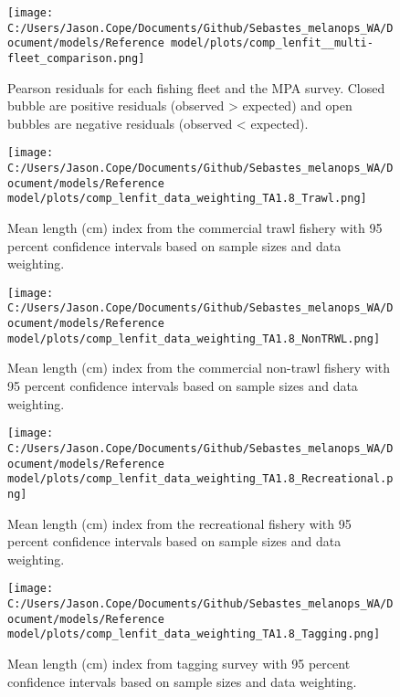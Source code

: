 \documentclass[11pt,
  english,
  letterpaper,
]{article}
\begin{document}
\begin{figure}
\centering
\texttt{[image: C:/Users/Jason.Cope/Documents/Github/Sebastes\_melanops\_WA/Document/models/Reference model/plots/comp\_lenfit\_\_multi-fleet\_comparison.png]}
\caption{Pearson residuals for each fishing fleet and the MPA survey. Closed bubble are positive residuals (observed \textgreater{} expected) and open bubbles are negative residuals (observed \textless{} expected).\label{fig:lt-pearson-resids}}
\end{figure}

\pagebreak

\begin{figure}
\centering
\texttt{[image: C:/Users/Jason.Cope/Documents/Github/Sebastes\_melanops\_WA/Document/models/Reference model/plots/comp\_lenfit\_data\_weighting\_TA1.8\_Trawl.png]}
\caption{Mean length (cm) index from the commercial trawl fishery with 95 percent confidence intervals based on sample sizes and data weighting.\label{fig:trawl-mean-len-fit}}
\end{figure}

\pagebreak

\begin{figure}
\centering
\texttt{[image: C:/Users/Jason.Cope/Documents/Github/Sebastes\_melanops\_WA/Document/models/Reference model/plots/comp\_lenfit\_data\_weighting\_TA1.8\_NonTRWL.png]}
\caption{Mean length (cm) index from the commercial non-trawl fishery with 95 percent confidence intervals based on sample sizes and data weighting.\label{fig:nontrawl-mean-len-fit}}
\end{figure}

\pagebreak

\begin{figure}
\centering
\texttt{[image: C:/Users/Jason.Cope/Documents/Github/Sebastes\_melanops\_WA/Document/models/Reference model/plots/comp\_lenfit\_data\_weighting\_TA1.8\_Recreational.png]}
\caption{Mean length (cm) index from the recreational fishery with 95 percent confidence intervals based on sample sizes and data weighting.\label{fig:rec-mean-len-fit}}
\end{figure}

\pagebreak

\begin{figure}
\centering
\texttt{[image: C:/Users/Jason.Cope/Documents/Github/Sebastes\_melanops\_WA/Document/models/Reference model/plots/comp\_lenfit\_data\_weighting\_TA1.8\_Tagging.png]}
\caption{Mean length (cm) index from tagging survey with 95 percent confidence intervals based on sample sizes and data weighting.\label{fig:tag-mean-len-fit}}
\end{figure}
\end{document}
